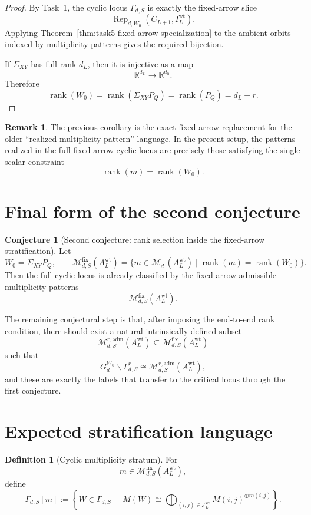\documentclass{article}
\newcommand{\rk}{\operatorname{rank}}
\newcommand{\R}{\mathbb{R}}
\newcommand{\Rep}{\operatorname{Rep}}
\theoremstyle{definition}
\newtheorem{definition}[theorem]{Definition}
\newtheorem{remark}[theorem]{Remark}
\newtheorem{conjecture}[theorem]{Conjecture}
\begin{document}
\begin{proof}
By Task~1, the cyclic locus $\Gamma_{d,S}$ is exactly the fixed-arrow slice
\[
\Rep_{d,W_0}(C_{L+1},I_L^{\mathrm{wt}}).
\]
Applying Theorem~\ref{thm:task5-fixed-arrow-specialization} to the ambient
orbits indexed by multiplicity patterns gives the required bijection.

If $\Sigma_{XY}$ has full rank $d_L$, then it is injective as a map
\[
\R^{d_L}\to \R^{d_0}.
\]
Therefore
\[
\rk(W_0)=\rk(\Sigma_{XY}P_Q)=\rk(P_Q)=d_L-r.
\]
\end{proof}

\begin{remark}
The previous corollary is the exact fixed-arrow replacement for the older
``realized multiplicity-pattern'' language. In the present setup, the patterns
realized in the full fixed-arrow cyclic locus are precisely those satisfying the
single scalar constraint
\[
\rk(m)=\rk(W_0).
\]
\end{remark}

\section{Final form of the second conjecture}

\begin{conjecture}[Second conjecture: rank selection inside the fixed-arrow stratification]
Let
\[
W_0=\Sigma_{XY}P_Q,
\qquad
\mathcal M_{d,S}^{\mathrm{fix}}(A_L^{\mathrm{wt}})
=
\{m\in \mathcal M_d^+(A_L^{\mathrm{wt}})\mid \rk(m)=\rk(W_0)\}.
\]
Then the full cyclic locus is already classified by the fixed-arrow admissible
multiplicity patterns
\[
\mathcal M_{d,S}^{\mathrm{fix}}(A_L^{\mathrm{wt}}).
\]

The remaining conjectural step is that, after imposing the end-to-end rank
condition, there should exist a natural intrinsically defined subset
\[
\mathcal M_{d,S}^{r,\mathrm{adm}}(A_L^{\mathrm{wt}})
\subseteq
\mathcal M_{d,S}^{\mathrm{fix}}(A_L^{\mathrm{wt}})
\]
such that
\[
G_d^{W_0}\backslash \Gamma_{d,S}^r
\cong
\mathcal M_{d,S}^{r,\mathrm{adm}}(A_L^{\mathrm{wt}}),
\]
and these are exactly the labels that transfer to the critical locus through the
first conjecture.
\end{conjecture}

\section{Expected stratification language}

\begin{definition}[Cyclic multiplicity stratum]
For
\[
m\in \mathcal M_{d,S}^{\mathrm{fix}}(A_L^{\mathrm{wt}}),
\]
define
\[
\Gamma_{d,S}[m]
:=
\left\{
W\in \Gamma_{d,S}
\;\middle|\;
M(W)\cong
\bigoplus_{(i,j)\in \mathcal I_L^{\mathrm{wt}}}
M(i,j)^{\oplus m(i,j)}
\right\}.
\]
\end{definition}
\end{document}
